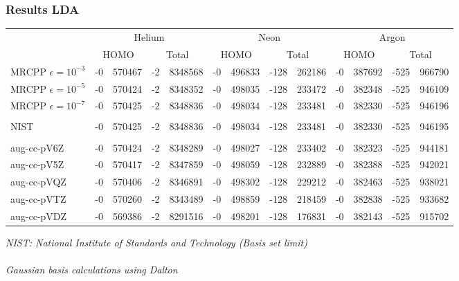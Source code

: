 \documentclass[mathserif]{beamer}
\begin{document}
\begin{frame}
	\frametitle{Results LDA}
	\begin{table}
		\tiny
		\centering
		\begin{tabular}{|l|r@{.}lr@{.}l|r@{.}lr@{.}l|r@{.}lr@{.}l|}
			\hline&
			\multicolumn{4}{c|}{Helium}&
			\multicolumn{4}{c|}{Neon}&
			\multicolumn{4}{c|}{Argon}\\
			&
			\multicolumn{2}{c}{HOMO}&
			\multicolumn{2}{c|}{Total}&
			\multicolumn{2}{c}{HOMO}&
			\multicolumn{2}{c|}{Total}&
			\multicolumn{2}{c}{HOMO}&
			\multicolumn{2}{c|}{Total}\\
			\hline
			MRCPP $\epsilon=10^{-3}$&
			  -0&570467&
			  -2&8348568&
			  -0&496833&
			-128&262186&
			  -0&387692&
			-525&966790\\
			MRCPP $\epsilon=10^{-5}$&
			  -0&570424&
			  -2&8348352&
			  -0&498035&
			-128&233472&
			  -0&382348&
			-525&946109\\
			MRCPP $\epsilon=10^{-7}$&
			  -0&570425&
			  -2&8348836&
			  -0&498034&
			-128&233481&
			  -0&382330&
			-525&946196\\
			\hline
			&\multicolumn{4}{c|}{}&
			\multicolumn{4}{c|}{}&
			\multicolumn{4}{c|}{}\\
			NIST&
			  -0&570425&
			  -2&8348836&
			  -0&498034&
			-128&233481&
			  -0&382330&
			-525&946195\\
			&\multicolumn{4}{c|}{}&
			\multicolumn{4}{c|}{}&
			\multicolumn{4}{c|}{}\\
			\hline
			aug-cc-pV6Z&
			  -0&570424&
			  -2&8348289&
			  -0&498027&
			-128&233402&
			  -0&382323&
			-525&944181\\
			aug-cc-pV5Z&
			  -0&570417&
			  -2&8347859&
			  -0&498059&
			-128&232889&
			  -0&382388&
			-525&942021\\
			aug-cc-pVQZ&
			  -0&570406&
			  -2&8346891&
			  -0&498302&
			-128&229212&
			  -0&382463&
			-525&938021\\
			aug-cc-pVTZ&
			  -0&570260&
			  -2&8343489&
			  -0&498859&
			-128&218459&
			  -0&382838&
			-525&933682\\
			aug-cc-pVDZ&
			  -0&569386&
			  -2&8291516&
			  -0&498201&
			-128&176831&
			  -0&382143&
			-525&915702\\
			\hline
		\end{tabular}
	\end{table}
	\tiny
	\it{NIST: National Institute of Standards and Technology (Basis set limit)}\\
	\ \\
	\it{Gaussian basis calculations using Dalton}\\
\end{frame}
\end{document}
